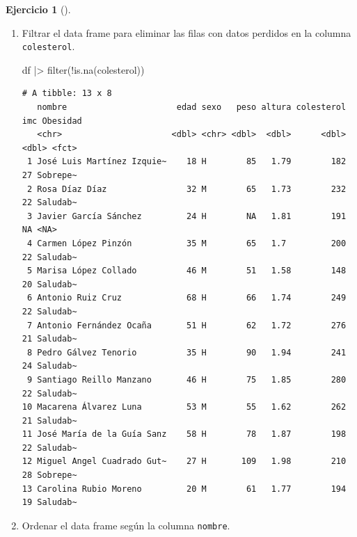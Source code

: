 \documentclass[
  a4paper,
]{scrreport}
\newenvironment{Shaded}{\begin{snugshade}}{\end{snugshade}}
\newcommand{\FunctionTok}[1]{\textcolor[rgb]{0.28,0.35,0.67}{#1}}
\newcommand{\NormalTok}[1]{\textcolor[rgb]{0.00,0.23,0.31}{#1}}
\newcommand{\SpecialCharTok}[1]{\textcolor[rgb]{0.37,0.37,0.37}{#1}}
\theoremstyle{definition}
\newtheorem{exercise}{Ejercicio}[chapter]
\theoremstyle{remark}
\begin{document}
\begin{exercise}[]
\begin{enumerate}
\begin{tcolorbox}
  \end{tcolorbox}
\item
  Filtrar el data frame para eliminar las filas con datos perdidos en la
  columna \texttt{colesterol}.

  \begin{tcolorbox}[enhanced jigsaw, coltitle=black, left=2mm, colback=white, leftrule=.75mm, toptitle=1mm, breakable, bottomrule=.15mm, titlerule=0mm, bottomtitle=1mm, title=\textcolor{quarto-callout-tip-color}{\faLightbulb}\hspace{0.5em}{Solución}, arc=.35mm, toprule=.15mm, rightrule=.15mm, colframe=quarto-callout-tip-color-frame, opacityback=0, colbacktitle=quarto-callout-tip-color!10!white, opacitybacktitle=0.6]

\begin{Shaded}
\begin{Highlighting}[]
\NormalTok{df }\SpecialCharTok{|\textgreater{}}
    \FunctionTok{filter}\NormalTok{(}\SpecialCharTok{!}\FunctionTok{is.na}\NormalTok{(colesterol))}
\end{Highlighting}
\end{Shaded}

\begin{verbatim}
# A tibble: 13 x 8
   nombre                      edad sexo   peso altura colesterol   imc Obesidad
   <chr>                      <dbl> <chr> <dbl>  <dbl>      <dbl> <dbl> <fct>   
 1 José Luis Martínez Izquie~    18 H        85   1.79        182    27 Sobrepe~
 2 Rosa Díaz Díaz                32 M        65   1.73        232    22 Saludab~
 3 Javier García Sánchez         24 H        NA   1.81        191    NA <NA>    
 4 Carmen López Pinzón           35 M        65   1.7         200    22 Saludab~
 5 Marisa López Collado          46 M        51   1.58        148    20 Saludab~
 6 Antonio Ruiz Cruz             68 H        66   1.74        249    22 Saludab~
 7 Antonio Fernández Ocaña       51 H        62   1.72        276    21 Saludab~
 8 Pedro Gálvez Tenorio          35 H        90   1.94        241    24 Saludab~
 9 Santiago Reillo Manzano       46 H        75   1.85        280    22 Saludab~
10 Macarena Álvarez Luna         53 M        55   1.62        262    21 Saludab~
11 José María de la Guía Sanz    58 H        78   1.87        198    22 Saludab~
12 Miguel Angel Cuadrado Gut~    27 H       109   1.98        210    28 Sobrepe~
13 Carolina Rubio Moreno         20 M        61   1.77        194    19 Saludab~
\end{verbatim}

  \end{tcolorbox}
\item
  Ordenar el data frame según la columna \texttt{nombre}.


\end{enumerate}
\end{exercise}
\end{document}
